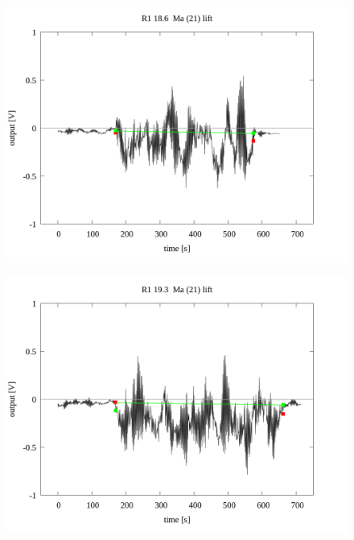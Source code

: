 \documentclass[a4paper]{jsarticle}
\begin{document}
\begin{figure}[htbp]
    \footnotesize
    \begin{center}
        \includegraphics[width=140mm]{../../../../33_result/210806/moving_average/21/lift/03/R1_18.6_ma(21)_lift_03.png}
    \end{center}
\end{figure}

\begin{figure}[htbp]
    \footnotesize
    \begin{center}
        \includegraphics[width=140mm]{../../../../33_result/210806/moving_average/21/lift/03/R1_19.3_ma(21)_lift_03.png}
    \end{center}
\end{figure}
\end{document}
